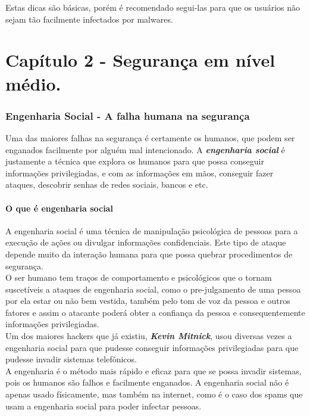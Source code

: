 \documentclass[12pt, letterpaper]{report}
\begin{document}
	Estas dicas são básicas, porém é recomendado segui-las para que os usuários não sejam tão facilmente infectados por malwares.\\

\pagebreak

\part{Capítulo 2 - Segurança em nível médio.}

\section*{Engenharia Social - A falha humana na segurança}
	Uma das maiores falhas na segurança é certamente os humanos, que podem ser enganados facilmente por alguém mal intencionado. A \textbf{\textit{engenharia social}} é justamente a técnica que explora os humanos para que possa conseguir informações privilegiadas, e com as informações em mãos, conseguir fazer ataques, descobrir senhas de redes sociais, bancos e etc.\\

\subsection{O que é engenharia social}
	A engenharia social é uma técnica de manipulação psicológica de pessoas para a execução de ações ou divulgar informações confidenciais. Este tipo de ataque depende muito da interação humana para que possa quebrar procedimentos de segurança.\\
	O ser humano tem traços de comportamento e psicológicos que o tornam suscetíveis a ataques de engenharia social, como o pre-julgamento de uma pessoa por ela estar ou não bem vestida, também pelo tom de voz da pessoa e outros fatores e assim o atacante poderá obter a confiança da pessoa e consequentemente informações privilegiadas.\\

	Um dos maiores hackers que já existiu, \textbf{\textit{Kevin Mitnick}}, usou diversas vezes a engenharia social para que pudesse conseguir informações privilegiadas para que pudesse invadir sistemas telefônicos.\\

	A engenharia é o método mais rápido e eficaz para que se possa invadir sistemas, pois os humanos são falhos e facilmente enganados. A engenharia social não é apenas usado físicamente, mas também na internet, como é o caso dos spams que usam a engenharia social para poder infectar pessoas.\\
\end{document}
